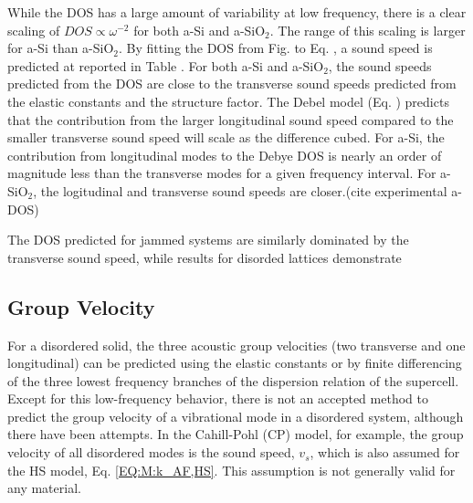 \documentclass[aps,prb,twocolumn,superscriptaddress,footinbib,amsmath,amssymb,floatfix]{revtex4}
\begin{document}
While the DOS has a large amount of variability at low frequency, 
there is a clear scaling of $DOS \propto \omega^{-2}$ for both 
a-Si and a-SiO$_2$. The range of this 
scaling is larger for a-Si than a-SiO$_2$. 
By fitting the DOS 
from Fig. to Eq. , a sound speed is predicted at reported in Table . 
For both a-Si and a-SiO$_2$, the sound speeds predicted from the DOS 
are close to the transverse sound speeds predicted from the elastic 
constants and the structure factor. The Debel model (Eq. ) predicts 
that the contribution from the larger longitudinal sound speed 
compared to the smaller transverse sound speed will scale as the 
difference cubed. For a-Si, 
the contribution from longitudinal modes to the Debye DOS is nearly 
an order of magnitude less than the transverse modes for a given 
frequency interval. For a-SiO$_2$, the logitudinal and transverse 
sound speeds are closer.(cite experimental a-DOS) 

The DOS predicted for jammed systems are similarly dominated by 
the transverse sound speed,\cite{vitelli_heat_2010} 
while results for disorded lattices demonstrate 
\cite{beltukov_ioffe-regel_2013,larkin_predicting_2013}


\subsection{\label{S:Structure}Group Velocity}

For a disordered solid, the three acoustic group 
velocities (two transverse and one 
longitudinal) can be predicted using the elastic constants
\cite{gale_general_2003} 
or by finite differencing of the three lowest frequency branches 
of the dispersion relation of the supercell.
\cite{he_thermal_2011,he_heat_2011} 
Except for this low-frequency behavior, there is not an 
accepted method to predict the group velocity of a 
vibrational mode in a disordered system, although there have been 
attempts.
\cite{cahill_lattice_1988,duda_reducing_2011,donadio_atomistic_2009,
he_heat_2011,he_thermal_2011} 
In the Cahill-Pohl (CP) model, for example, the group velocity of 
all disordered modes is the sound speed, $v_s$, which is also assumed  
for the HS model, Eq. \eqref{EQ:M:k_AF,HS}.
\cite{cahill_lattice_1988} This assumption is not generally valid  
for any material.\cite{feldman_numerical_1999,duda_reducing_2011,
donadio_atomistic_2009,he_heat_2011,he_thermal_2011}
\end{document}

